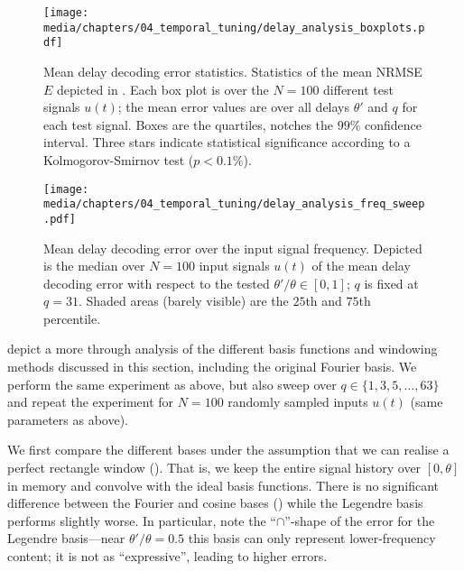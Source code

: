 \begin{figure}[t]
	\centering
	\texttt{[image: media/chapters/04\_temporal\_tuning/delay\_analysis\_boxplots.pdf]}%
	{\label{fig:delay_analysis_boxplots_a}}%
	{\label{fig:delay_analysis_boxplots_b}}%
	{\label{fig:delay_analysis_boxplots_c}}%
	\caption[Mean delay decoding error statistics]{Mean delay decoding error statistics. Statistics of the mean NRMSE $E$ depicted in . Each box plot is over the $N = 100$ different test signals $u(t)$; the mean error values are over all delays $\theta'$ and $q$ for each test signal.
	Boxes are the quartiles, notches the $99\%$ confidence interval.
	Three stars indicate statistical significance according to a Kolmogorov-Smirnov test ($p < 0.1\%$).
	}
	\label{fig:delay_analysis_boxplots}
	\vspace*{-0.25em}
\end{figure}

\begin{figure}[t]
	\centering
	\texttt{[image: media/chapters/04\_temporal\_tuning/delay\_analysis\_freq\_sweep.pdf]}%
	{\label{fig:delay_analysis_freq_sweep_a}}%
	{\label{fig:delay_analysis_freq_sweep_b}}%
	{\label{fig:delay_analysis_freq_sweep_c}}%
	\caption[Mean delay decoding error over the input signal frequency]{Mean delay decoding error over the input signal frequency.
	Depicted is the median over $N = 100$ input signals $u(t)$ of the mean delay decoding error with respect to the tested $\theta' / \theta \in [0, 1]$; $q$ is fixed at $q = 31$.
	Shaded areas (barely visible) are the $25$th and $75$th percentile.
	}
	\label{fig:delay_analysis_freq_sweep}
	\vspace*{-0.75em}
\end{figure}

 depict a more through analysis of the different basis functions and windowing methods discussed in this section, including the original Fourier basis.
We perform the same experiment as above, but also sweep over $q \in \{1, 3, 5, \ldots, 63\}$ and repeat the experiment for $N = 100$ randomly sampled inputs $u(t)$ (same parameters as above).

We first compare the different bases under the assumption that we can realise a perfect rectangle window ().
That is, we keep the entire signal history over $[0, \theta]$ in memory and convolve with the ideal basis functions.
There is no significant difference between the Fourier and cosine bases () while the Legendre basis performs slightly worse.
In particular, note the \enquote{$\cap$}-shape of the error for the Legendre basis---near $\theta' / \theta = 0.5$ this basis can only represent lower-frequency content; it is not as \enquote{expressive}, leading to higher errors.

